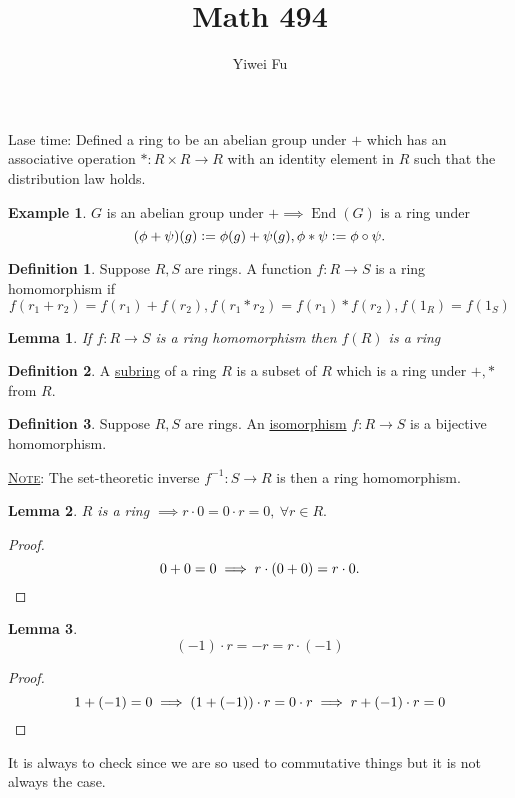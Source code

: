 \documentclass{article}
\newcommand{\defeq}{\vcentcolon=}
\newcommand{\fancyem}[1]{\underline{\textsc{#1}}}
\newtheorem{lemma}{Lemma}[section]
\theoremstyle{definition}
\newtheorem{definition}{Definition}[section]
\newtheorem{example}[theorem]{Example}
\theoremstyle{remark}
\begin{document}
\renewcommand{\ref}[1]{\autoref{#1}}
\title{Math 494}
\author{Yiwei Fu}
\date{}
\maketitle

\section{}
Lase time: Defined a ring to be an abelian group under $+$ which has an associative operation $*: R \times R \to R$ with an identity element in $R$ such that the distribution law holds.

\begin{example}
$G$ is an abelian group under $+ \implies \operatorname{End}(G)$ is a ring under
\[
(\phi + \psi)(g) \defeq \phi(g) + \psi(g), \phi * \psi \defeq \phi \circ \psi.
\]
\end{example}

\begin{definition}
Suppose $R, S$ are rings. A function $f: R \to S$ is a ring homomorphism if 
\[
f(r_1 + r_2) = f(r_1) + f(r_2), f(r_1 * r_2) = f(r_1) * f(r_2), f(1_R) = f(1_S)
\]
\end{definition}
\begin{lemma}
If $f: R \to S$ is a ring homomorphism then $f(R)$ is a ring
\end{lemma}

\begin{definition}
A \underline{subring} of a ring $R$ is a subset of $R$ which is a ring under $+, *$ from $R$.
\end{definition}
\begin{definition}
Suppose $R, S$ are rings. An \underline{isomorphism} $f: R \to S$ is a bijective homomorphism.
\end{definition}
\fancyem{Note}: The set-theoretic inverse $f^{-1}: S \to R$ is then a ring homomorphism.

\begin{lemma}
$R$ is a ring $\implies r\cdot 0 = 0 \cdot r = 0,\ \forall r \in R.$
\end{lemma}
\begin{proof}
\[0 + 0 = 0 \implies r\cdot(0 + 0) = r \cdot 0. \qedhere
\]
\end{proof}

\begin{lemma}
\[(-1)\cdot r = -r = r \cdot (-1)\]
\end{lemma}
\begin{proof}
\[
1 + (-1) = 0 \implies (1 + (-1)) \cdot r = 0 \cdot r \implies r + (-1)\cdot r = 0 \qedhere
\]
\end{proof}
It is always to check since we are so used to commutative things but it is not always the case.
\end{document}
